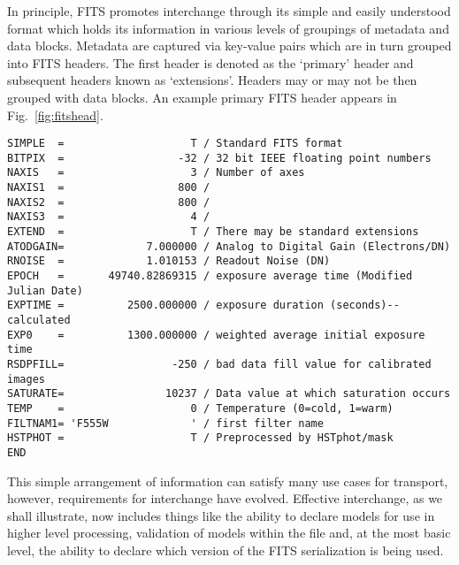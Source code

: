 \documentclass[final,authoryear,5p,times,twocolumn]{elsarticle}
\begin{document}
{{In principle, FITS promotes interchange through its simple and easily
understood format which holds its information in various levels of groupings
of metadata and data blocks. Metadata are captured via key-value pairs which
are in turn grouped into FITS headers. The first header is denoted as the
`primary' header and subsequent headers known as `extensions'. Headers may or
may not be then grouped with data blocks.  An example primary FITS header
appears in Fig.~\ref{fig:fitshead}.


\begin{figure*}
\begin{minipage}{\textwidth}
\begin{verbatim}
SIMPLE  =                    T / Standard FITS format
BITPIX  =                  -32 / 32 bit IEEE floating point numbers
NAXIS   =                    3 / Number of axes
NAXIS1  =                  800 /
NAXIS2  =                  800 /
NAXIS3  =                    4 /
EXTEND  =                    T / There may be standard extensions
ATODGAIN=             7.000000 / Analog to Digital Gain (Electrons/DN)
RNOISE  =             1.010153 / Readout Noise (DN)
EPOCH   =       49740.82869315 / exposure average time (Modified Julian Date)
EXPTIME =          2500.000000 / exposure duration (seconds)--calculated
EXP0    =          1300.000000 / weighted average initial exposure time
RSDPFILL=                 -250 / bad data fill value for calibrated images
SATURATE=                10237 / Data value at which saturation occurs
TEMP    =                    0 / Temperature (0=cold, 1=warm)
FILTNAM1= 'F555W             ' / first filter name
HSTPHOT =                    T / Preprocessed by HSTphot/mask
END
\end{verbatim}
\caption{Representative simple primary header of a FITS file showing an assortment of FITS keywords and their associated values. Bytes which contain data may or may not follow the `END' keyword of the header.}
\label{fig:fitshead}
\end{minipage}
\end{figure*}


This simple arrangement of information can satisfy many use cases for
transport, however, requirements for interchange have evolved. Effective
interchange, as we shall illustrate, now includes things like the ability to
declare models for use in higher level processing, validation of models within
the file and, at the most basic level, the ability to declare which version of
the FITS serialization is being used.


}}
\end{document}
